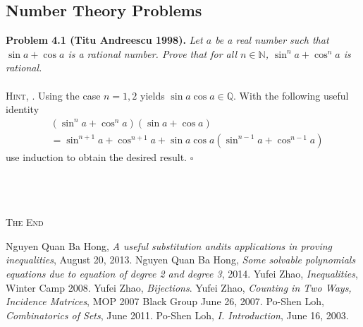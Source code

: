 \documentclass[a4paper,oneside]{article}
\numberwithin{equation}{section}
\begin{document}
\subsection{Number Theory Problems}
\textbf{Problem 4.1 (Titu Andreescu 1998).} \textit{Let $a$ be a real number such that $\sin a +\cos a$ is a rational number. Prove that for all $n \in \mathbb{N}$, $\sin ^n a + \cos ^n a$ is rational.}\\
\\
\textsc{Hint, \cite{7}.} Using the case $n=1,2$ yields $\sin a\cos a \in \mathbb{Q}$. With the following useful identity
\begin{align}
&\left( {{{\sin }^n}a + {{\cos }^n}a} \right)\left( {\sin a + \cos a} \right) \\
&= {\sin ^{n + 1}}a + {\cos ^{n + 1}}a + \sin a\cos a\left( {{{\sin }^{n - 1}}a + {{\cos }^{n - 1}}a} \right)
\end{align}
use induction to obtain the desired result. \hfill $\square$\\
\\
\\
\\
\begin{center}
\textsc{The End}
\end{center}
\newpage
\begin{thebibliography}{999}
 Nguyen Quan Ba Hong, \textit{A useful substitution andits applications in proving inequalities}, August 20, 2013.
 Nguyen Quan Ba Hong, \textit{Some solvable polynomials equations due to equation of degree 2 and degree 3}, 2014.
 Yufei Zhao, \textit{Inequalities}, Winter Camp 2008.
 Yufei Zhao, \textit{Bijections}.
 Yufei Zhao, \textit{Counting in Two Ways, Incidence Matrices}, MOP 2007 Black Group June 26, 2007.
 Po-Shen Loh, \textit{Combinatorics of Sets}, June 2011.
 Po-Shen Loh, \textit{I. Introduction}, June 16, 2003.
\end{thebibliography}
\end{document}
